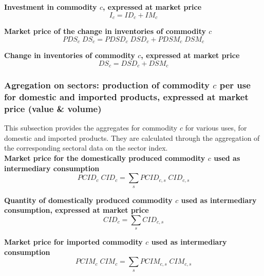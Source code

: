 \documentclass[12pt]{article}
\numberwithin{equation}{section}
\begin{document}
\noindent\textbf{Investment in commodity $c$, expressed at market price} \\
\begin{dmath}
I_{c} = ID_{c} + IM_{c}
\end{dmath}

\noindent\textbf{Market price of the change in inventories of commodity $c$} \\
\begin{dmath}
PDS_{c} \; DS_{c} = PDSD_{c} \; DSD_{c} + PDSM_{c} \; DSM_{c}
\end{dmath}

\noindent\textbf{Change in inventories of commodity $c$, expressed at market price} \\
\begin{dmath}
DS_{c} = DSD_{c} + DSM_{c}
\end{dmath}



\subsubsection{Agregation on sectors: production of commodity $c$ per use for domestic and imported products, expressed at market price (value \& volume)}


This subsection provides the aggregates for commodity $c$ for various uses, for domestic and imported products. They are calculated through the aggregation of the corresponding sectoral data on the sector index. \\

\noindent\textbf{Market price for the domestically produced commodity $c$ used as intermediary consumption} \\
\begin{dmath}
PCID_{c} \; CID_{c} = \sum_{s} PCID_{c, s} \; CID_{c, s}
\end{dmath}

\noindent\textbf{Quantity of domestically produced commodity $c$ used as intermediary consumption, expressed at market price} \\
\begin{dmath}
CID_{c} = \sum_{s} CID_{c, s}
\end{dmath}

\noindent\textbf{Market price for imported commodity $c$ used as intermediary consumption} \\
\begin{dmath}
PCIM_{c} \; CIM_{c} = \sum_{s} PCIM_{c, s} \; CIM_{c, s}
\end{dmath}
\end{document}
